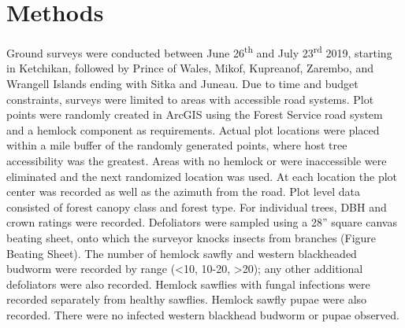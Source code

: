 \section{Methods}

Ground surveys were conducted between June 26\textsuperscript{th} and July 23\textsuperscript{rd} 2019, starting in Ketchikan, followed by Prince of Wales, Mikof, Kupreanof, Zarembo, and Wrangell Islands ending with Sitka and Juneau.  Due to time and budget constraints, surveys were limited to areas with accessible road systems.  Plot points were randomly created in ArcGIS using the Forest Service road system and a hemlock component as requirements.  Actual plot locations were placed within a  mile buffer of the randomly generated points, where host tree accessibility was the greatest.  Areas with no hemlock or were inaccessible were eliminated and the next randomized location was used.   At each location the plot center was recorded as well as the azimuth from the road.  Plot level data consisted of forest canopy class and forest type. For individual trees, DBH and crown ratings were recorded. Defoliators were sampled using a 28” square canvas beating sheet, onto which the surveyor knocks insects from branches (Figure Beating Sheet).  The number of hemlock sawfly and western blackheaded budworm were recorded by range (<10, 10-20, >20); any other additional defoliators were also recorded.  Hemlock sawflies with fungal infections were recorded separately from healthy sawflies.  Hemlock sawfly pupae were also recorded.  There were no infected western blackhead budworm or pupae observed.   




